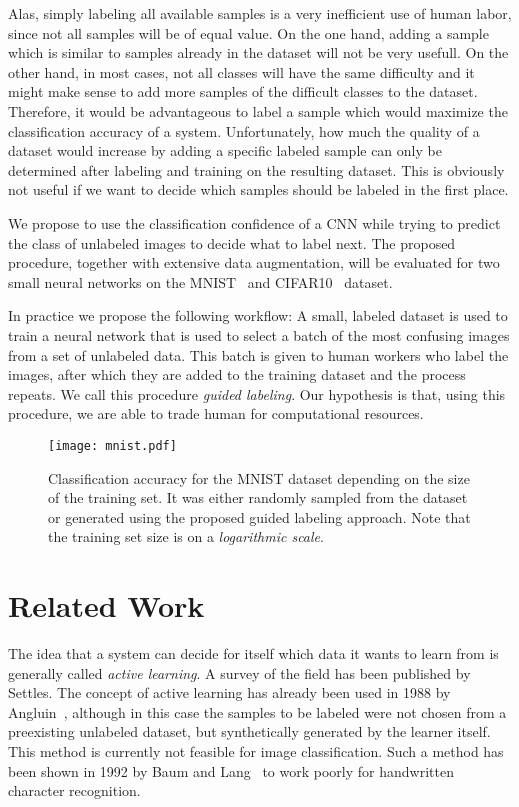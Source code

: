\documentclass[10pt,twocolumn,letterpaper]{article}
\begin{document}
Alas, simply labeling all available samples is a very inefficient use
of human labor, since not all samples will be of equal value. On the
one hand, adding a sample which is similar to samples already in the
dataset will not be very usefull. On the other hand, in most cases,
not all classes will have the same difficulty and it might make sense
to add more samples of the difficult classes to the dataset.
Therefore, it would be advantageous to label a sample which would
maximize the classification accuracy of a system. Unfortunately, how
much the quality of a dataset would increase by adding a specific
labeled sample can only be determined after labeling and training on
the resulting dataset. This is obviously not useful if we want to
decide which samples should be labeled in the first place.

We propose to use the classification confidence of a CNN while trying
to predict the class of unlabeled images to decide what to label next.
The proposed procedure, together with extensive data augmentation,
will be evaluated for two small neural networks on the
MNIST~\cite{lecun1998gradient} and
CIFAR10~\cite{krizhevsky2009learning} dataset.

In practice we propose the following workflow: A small, labeled
dataset is used to train a neural network that is used to select a
batch of the most confusing images from a set of unlabeled data. This
batch is given to human workers who label the images, after which they
are added to the training dataset and the process repeats. We call
this procedure \emph{guided labeling}. Our hypothesis is that, using
this procedure, we are able to trade human for computational
resources.

\begin{figure}[t]
  \centering
  \texttt{[image: mnist.pdf]}
  \caption{Classification accuracy for the MNIST dataset depending on
    the size of the training set. It was either randomly sampled from
    the dataset or generated using the proposed guided labeling
    approach. Note that the training set size is on a
    \textit{logarithmic scale}.\label{mnistacc}}
\end{figure}

\section{Related Work}
\label{sec:related-work-1}

The idea that a system can decide for itself which data it wants to
learn from is generally called \textit{active learning}. A survey of
the field has been published by Settles\cite{settles2010active}. The
concept of active learning has already been used in 1988 by
Angluin~\cite{angluin1988queries}, although in this case the samples
to be labeled were not chosen from a preexisting unlabeled dataset,
but synthetically generated by the learner itself. This method is
currently not feasible for image classification. Such a method has
been shown in 1992 by Baum and Lang~\cite{baum1992query} to work
poorly for handwritten character recognition.
\end{document}
